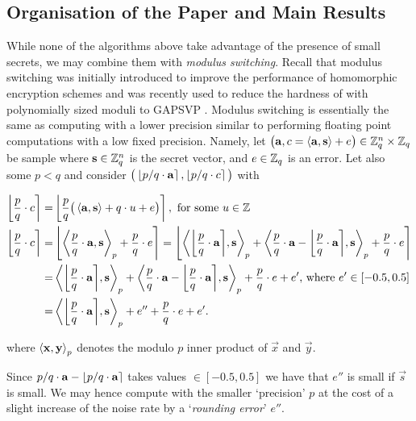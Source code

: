 \subsection{Organisation of the Paper and Main Results}
While none of the algorithms above take advantage of the presence of small secrets, we may combine them with  {\it modulus switching}. Recall that modulus switching was initially introduced to improve the performance of homomorphic encryption schemes \cite{brakerski-vaikuntanathan:focs2011} and was recently used to reduce the hardness of \LWE with polynomially sized moduli to GAPSVP \cite{brakerski-langlois-peikert-regev-stehle:stoc13}. Modulus switching is essentially the same as computing with a lower precision similar to performing floating point computations with a low fixed precision. Namely, let $\big(\mathbf{a},
c=\left\langle {\mathbf{a}},{\mathbf{s}}\right\rangle + e\big) \in \mathbb{Z}_q^n \times \mathbb{Z}_q$ be \LWE sample 
where $\mathbf{s} \in \mathbb{Z}_q^n$ is the secret vector, and $e \in \mathbb{Z}_q$ is an error. Let also some $p < q $ and consider $\big(\left\lfloor{{p}/{q} \cdot \mathbf{a}}\right\rceil, \left\lfloor{{p}/{q} \cdot c}\right\rceil\big)$ with
\begin{small}
\begin{align}
\label{eq:roundingerror}
\round{\frac{p}{q} \cdot c} =& \round{\frac{p}{q} \big( \dotp{\vec{a}}{\vec{s}}+q \cdot u +e \big)}, \mbox{ for some $u \in \Z$}\nonumber\\
\round{\frac{p}{q} \cdot c} =& \round{ \dotp{ \frac{p}{q} \cdot \vec{a} }{\vec{s} }_{p} + \frac{p}{q} \cdot e} =  \round{ \dotp{ \round{ \frac{p}{q} \cdot \vec{a} }}{\vec{s} }_{p} + \dotp{\frac{p}{q} \cdot \vec{a} - \round{ \frac{p}{q} \cdot \vec{a} }}{\vec{s}}_{p} + \frac{p}{q} \cdot e}\nonumber\\
  =& \dotp{ \round{ \frac{p}{q} \cdot \vec{a} }}{\vec{s} }_{p} + \dotp{\frac{p}{q} \cdot \vec{a} - \round{ \frac{p}{q} \cdot \vec{a} }}{\vec{s}}_{p} + \frac{p}{q} \cdot e + e' \textnormal{, where } e' \in [-0.5,0.5] \nonumber\\
  =& \dotp{ \round{ \frac{p}{q} \cdot \vec{a} }}{\vec{s} }_{p} + e'' + \frac{p}{q}\cdot e + e'.
\end{align}
\end{small}
where $\left\langle {\mathbf{x}},{\mathbf{y}}\right\rangle_{p}$ denotes the modulo $p$ inner product of $\vec{x}$ and $\vec{y}$.

Since ${p}/{q} \cdot \vec{a} - \round{ {p}/{q} \cdot \vec{a} }$ takes values $\in [-0.5,0.5]$ we have that $e''$ is small if $\vec{s}$ is small. We may hence compute with the smaller `precision' $p$ 
at the cost of a slight increase of the noise rate by  a `{\it rounding error}' $e''$. 
 
